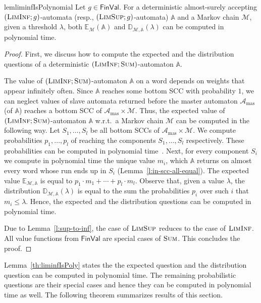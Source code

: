 \documentclass{lmcs}
\newcommand{\masterA}{\mathcal{A}_{\textrm{mas}}}
\newcommand{\nestedA}{\mathbb{A}}
\newcommand{\fsum}{\textsc{Sum}}
\newcommand{\fliminf}{\textsc{LimInf}}
\newcommand{\flimsup}{\textsc{LimSup}}
\newcommand{\const}{\lambda}
\newcommand{\FinVal}{\mathsf{FinVal}}
\newcommand{\expected}{\mathbb{E}}
\newcommand{\distrib}{\mathbb{D}}
\newcommand{\markov}{\mathcal{M}}
\begin{document}
\begin{restatable}{lem}{liminfIsPolynomial}\label{th:liminfIsPoly}
Let $g \in \FinVal$.
For a deterministic almost-surely accepting  $(\fliminf;g)$-automata (resp., $(\flimsup; g)$-automata) $\nestedA$ and a Markov
chain $\markov$, given a threshold $\const$, both $\expected_{\markov}(\nestedA)$
and $\distrib_{\markov,\nestedA}(\const)$ can be computed in polynomial time.
\end{restatable}
\begin{proof}
First, we discuss how to compute the expected and the distribution questions of a deterministic $(\fliminf; \fsum)$-automaton $\nestedA$.

The value of $(\fliminf; \fsum)$-automaton $\nestedA$ on a word depends on weights that appear infinitely often.
Since $\nestedA$ reaches some bottom SCC with probability $1$,
we can neglect values of slave automata returned before the master automaton $\masterA$ (of $\nestedA$)
reaches a bottom SCC of $\masterA \times \markov$.
Thus, the expected value of $(\fliminf; \fsum)$-automaton $\nestedA$ w.r.t.\ a Markov chain $\markov$ can be computed in the following way.
Let $S_1, \ldots, S_l$ be all bottom SCCs of $\masterA \times \markov$.
We compute probabilities $p_1, \ldots, p_l$ of reaching the components $S_1, \ldots, S_l$ respectively.
These probabilities can be computed in polynomial time~\cite{BaierBook}.
Next, for every component $S_i$ we compute in polynomial time the unique value $m_i$, which $\nestedA$ returns on almost every word
whose run ends up in $S_i$ (Lemma~\ref{l:in-scc-all-equal}).
The expected value $\expected_{\markov,\nestedA}$ is equal to $p_1 \cdot m_1 + \cdots + p_l \cdot m_l$.
Observe that, given a value $\const$, the distribution $\distrib_{\markov, \nestedA}(\const)$ is equal to
the sum the probabilities $p_i$ over such $i$ that $m_i \leq \const$.
Hence, the expected and the distribution questions can be computed in polynomial time.

Due to Lemma~\ref{l:sup-to-inf},  the case of $\flimsup$ reduces to the case of $\fliminf$.
All value functions from $\FinVal$ are special cases of $\fsum$.
This concludes the proof.
\end{proof}

Lemma~\ref{th:liminfIsPoly} states the the expected question and the distribution question can be computed in polynomial time.
The remaining probabilistic questions are their  special cases and hence they can be computed in polynomial time as well.
The following theorem summarizes results of this section.
\end{document}
